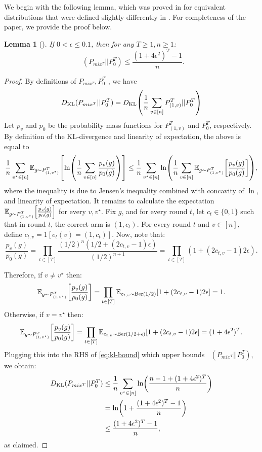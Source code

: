 \documentclass[a4paper,11pt]{article}
\newtheorem{lemma}[theorem]{Lemma}
\theoremstyle{definition}
\newcommand{\Ber}{\mathrm{Ber}}
\newcommand{\KL}{\mathop{D_{\mathrm{KL}}}\limits}
\begin{document}
We begin with the following lemma, which was proved in \cite{ito2024minimax} for equivalent distributions that were defined slightly differently in \cite{ito2024minimax}. For completeness of the paper, we provide the proof below.
\begin{lemma}[\cite{ito2024minimax}] \label{lem:kl-bound}
    If $0 < \epsilon \leq 0.1$, then for any $T \geq 1, n \geq 1$:
    \[
    \KL(P_{mix^T} || P^T_0) \leq \frac{(1 + 4 \epsilon^2)^T -1}{n}.
    \]
\end{lemma}

\begin{proof}
    By definitions of $P_{mix^T}, P^T_0$ , we have
    \[
        \KL(P_{mix^T} || P^T_0) = \KL \mleft(\frac{1}{n} \sum_{v \in [n]} P_{(1,v)}^T || P^T_0 \mright)
    \]
    Let $p_v$ and $p_0$ be the probability mass functions for $P_{(1,v)}^T$ and $P^T_0$, respectively.  By definition of the KL-divergence and linearity of expectation, the above is equal to
    \begin{equation} \label{eq:kl-bound}
    \frac{1}{n} \sum_{v^\star \in [n]} \mathbb{E}_{g \sim P_{(1,v^\star)}^T} \mleft[ \ln \mleft( \frac{1}{n} \sum_{v \in [n] } \frac{p_v(g)}{p_0(g)} \mright) \mright]
    \leq
    \frac{1}{n} \sum_{v^\star \in [n]} \ln \mleft( \frac{1}{n} \sum_{v \in [n]}  \mathbb{E}_{g \sim P_{(1,v^\star)}^T} \mleft[ \frac{p_v(g)}{p_0(g)}  \mright] \mright),
    \end{equation}
    where the inequality is due to Jensen's inequality combined with concavity of $\ln$, and linearity of expectation. It remains to calculate the expectation $ \mathbb{E}_{g \sim P_{(1,v^\star)}^T} \mleft[ \frac{p_v(g)}{p_0(g)}  \mright]$ for every $v,v^\star$. Fix $g$, and for every round $t$, let $c_t \in \{0,1\}$ such that in round $t$, the correct arm is $(1, c_t)$. For every round $t$ and $v \in [n]$, define $c_{t,v} = 1[e_t(v) = (1,c_t)]$. Now, note that:
    \[
    \frac{p_v(g)}{p_0(g)} = \prod_{t \in [T]} \frac{(1/2)^n (1/2 + (2c_{t,v} - 1) \epsilon)}{(1/2)^{n+1}}
    = \prod_{t \in [T]} (1 + (2c_{t,v} - 1)2\epsilon).
    \]

    Therefore, if $v \neq v^\star$ then:
    \[
    \mathbb{E}_{g \sim P_{(1,v^\star)}^T} \mleft[ \frac{p_v(g)}{p_0(g)}  \mright]
    =
    \prod_{t \in [T]} \mathbb{E}_{c_{t,v} \sim \Ber(1/2)}  \mleft[1 + (2c_{t,v} - 1)2\epsilon \mright] = 1.
    \]
    Otherwise, if $v=v^\star$ then:
    \[
    \mathbb{E}_{g \sim P_{(1,v^\star)}^T} \mleft[ \frac{p_v(g)}{p_0(g)}  \mright]
    =
    \prod_{t \in [T]} \mathbb{E}_{c_{t,v} \sim \Ber(1/2 + \epsilon)}  \mleft[1 + (2c_{t,v} - 1)2\epsilon \mright] = (1 + 4\epsilon^2)^T.
    \]
    Plugging this into the RHS of \eqref{eq:kl-bound} which upper bounds $\KL(P_{mix^T} || P^T_0)$, we obtain:
    \begin{align*}
            \KL(P_{mix^T} || P^T_0)
            &\leq
            \frac{1}{n} \sum_{v^\star \in [n]} \ln \mleft( \frac{n-1 + (1+4\epsilon^2)^T}{n} \mright) \\
            &=  \ln \mleft( 1 + \frac{(1+4\epsilon^2)^T -1}{n} \mright) \\
            & \leq \frac{(1+4\epsilon^2)^T -1}{n},
    \end{align*}
    as claimed.
\end{proof}
\end{document}
